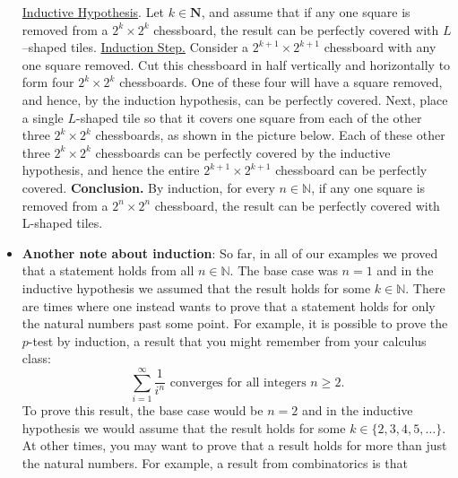 \documentclass{report}
\begin{document}
\begin{itemize}
{                \bigbreak \noindent 
                \bigbreak \noindent 
                \underline{Inductive Hypothesis}. Let $k \in \mathbf{N}$, and assume that if any one square is removed from a $2^{k} \times 2^{k}$ chessboard, the result can be perfectly covered with $L$–shaped tiles.
                \bigbreak \noindent 
                \underline{Induction Step.} Consider a $2^{k+1} \times 2^{k+1}$ chessboard with any one square removed.  Cut this chessboard in half vertically and horizontally to form four $2^k \times 2^k$ chessboards.  One of these four will have a square removed, and hence, by the induction hypothesis, can be perfectly covered.
                \bigbreak \noindent 
                Next, place a single $L$-shaped tile so that it covers one square from each of the other three $2^{k} × 2^{k}$ chessboards, as shown in the picture below.
                \bigbreak \noindent 
                \bigbreak \noindent 
                Each of these other three $2^k \times 2^k$ chessboards can be perfectly covered by the  inductive hypothesis, and hence the entire $2^{k+1} \times 2^{k+1}$ chessboard can be perfectly covered.
                \bigbreak \noindent 
            }
            \textbf{Conclusion.} By induction, for every $n \in \mathbb{N}$, if any one square is removed from a  $2^n \times 2^n$ chessboard, the result can be perfectly covered with L-shaped tiles.
        \item \textbf{Another note about induction}: So far, in all of our examples we proved that a statement holds from all $n \in \mathbb{N}$.  
            The base case was $n = 1$ and in the inductive hypothesis we assumed that the result holds for some $k \in \mathbb{N}$.  
            \bigbreak \noindent 
            There are times where one instead wants to prove that a statement holds for only the natural numbers past some point.  
            For example, it is possible to prove the $p$-test by induction, a result that you might remember from your calculus class:
            \[
                \sum_{i=1}^\infty \frac{1}{i^n} \text{ converges for all integers } n \geq 2.
            \]
            To prove this result, the base case would be $n = 2$ and in the inductive hypothesis we would assume that the result holds for some $k \in \{2, 3, 4, 5, \ldots\}$.  
            \bigbreak \noindent 
            At other times, you may want to prove that a result holds for more than just the natural numbers.  
            For example, a result from combinatorics is that

\end{itemize}
\end{document}
